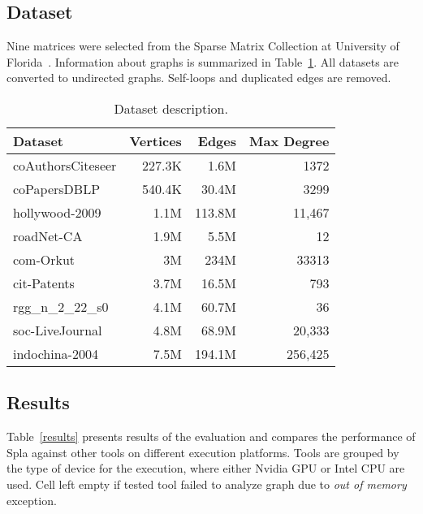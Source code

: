 \subsection{Dataset}

Nine matrices were selected from the Sparse Matrix Collection at University of Florida~\cite{dataset:10.1145/2049662.2049663}. 
Information about graphs is summarized in Table~\ref{dataset:info}. 
All datasets are converted to undirected graphs. 
Self-loops and duplicated edges are removed.

\begin{table}[tbp]
\caption{Dataset description.} 
\begin{center}
    \begin{tabular}{|l|r|r|r|}
    \hline
    Dataset & Vertices  & Edges & Max Degree \\
    \hline
    \hline
    coAuthorsCiteseer & 227.3K &   1.6M &    1372 \\
    coPapersDBLP      & 540.4K &  30.4M &    3299 \\
    hollywood-2009    &   1.1M & 113.8M &  11,467 \\
    roadNet-CA        &   1.9M &   5.5M &      12 \\
    com-Orkut         &     3M &   234M &   33313 \\
    cit-Patents       &   3.7M &  16.5M &     793 \\
    rgg\_n\_2\_22\_s0 &   4.1M &  60.7M &      36 \\
    soc-LiveJournal   &   4.8M &  68.9M &  20,333 \\
    indochina-2004    &   7.5M & 194.1M & 256,425 \\
    \hline
    \end{tabular}
    \label{dataset:info}
\end{center}
\end{table}

\subsection{Results}

Table~\ref{results} presents results of the evaluation and compares the performance of Spla against other tools on different execution platforms.
Tools are grouped by the type of device for the execution, where either Nvidia GPU or Intel CPU are used. 
Cell left empty if tested tool failed to analyze graph due to \textit{out of memory} exception.

